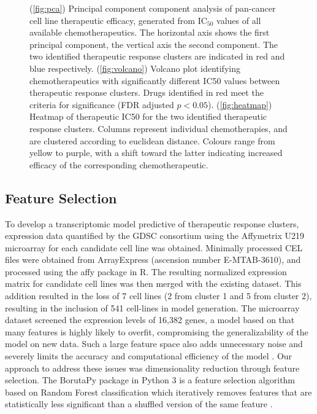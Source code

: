 \documentclass[10pt, letterpaper]{article}
\begin{document}
\begin{multicols}{2}
\begin{figure}[!ht]
    \caption{(\ref{fig:pca}) Principal component component analysis of pan-cancer cell line therapeutic efficacy, generated from IC$_{50}$ values of all available chemotherapeutics. The horizontal axis shows the first principal component, the vertical axis the second component. The two identified therapeutic response clusters are indicated in red and blue respectively. (\ref{fig:volcano}) Volcano plot identifying chemotherapeutics with significantly different IC50 values between therapeutic response clusters. Drugs identified in red meet the criteria for significance (FDR adjusted $p<0.05$). (\ref{fig:heatmap}) Heatmap of therapeutic IC50 for the two identified therapeutic response clusters. Columns represent individual chemotherapies, and are clustered according to euclidean distance. Colours range from yellow to purple, with a shift toward the latter indicating increased efficacy of the corresponding chemotherapeutic.}
    \label{fig:clustering}
\end{figure}



\subsection*{Feature Selection}
To develop a transcriptomic model predictive of therapeutic response clusters, expression data quantified by the GDSC consortium using the Affymetrix U219 microarray for each candidate cell line was obtained. Minimally processed CEL files were obtained from ArrayExpress (ascension number E-MTAB-3610), and processed using the affy package in R. The resulting normalized expression matrix for candidate cell lines was then merged with the existing dataset. This addition resulted in the loss of 7 cell lines (2 from cluster 1 and 5 from cluster 2), resulting in the inclusion of 541 cell-lines in model generation. The microarray dataset screened the expression levels of 16,382 genes, a model based on that many features is highly likely to overfit, compromising the generalizability of the model on new data. Such a large feature space also adds unnecessary noise and severely limits the accuracy and computational efficiency of the model \cite{liu}. Our approach to address these issues was dimensionality reduction through feature selection. The BorutaPy package in Python 3 is a feature selection algorithm based on Random Forest classification which iteratively removes features that are statistically less significant than a shuffled version of the same feature \cite{kursa}.



\end{multicols}
\end{document}
